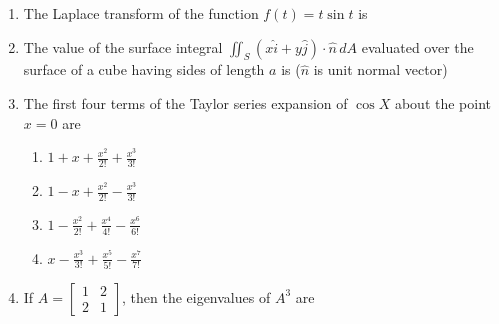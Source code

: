 \documentclass[journal,12pt,onecolumn]{IEEEtran}
\theoremstyle{remark}
\begin{document}
\begin{enumerate}
\item The Laplace transform of the function $f(t) = t \sin t$ is
\hfill{}
\begin{enumerate}
\end{enumerate}

\item The value of the surface integral $\iint_S (x\hat{i}+y\hat{j})\cdot\hat{n}\,dA$ evaluated over the surface of a cube having sides of length $a$ is ($\hat{n}$ is unit normal vector)
\hfill{}
\begin{enumerate}
\end{enumerate}

\item The first four terms of the Taylor series expansion of $\cos X$ about the point $x = 0$ are
\hfill{}
\begin{enumerate}
\item $1 + x + \frac{x^2}{2!} + \frac{x^3}{3!}$
\item $1 - x + \frac{x^2}{2!} - \frac{x^3}{3!}$
\item $1 - \frac{x^2}{2!} + \frac{x^4}{4!} - \frac{x^6}{6!}$
\item $x - \frac{x^3}{3!} + \frac{x^5}{5!} - \frac{x^7}{7!}$
\end{enumerate}

\item If $A = \begin{bmatrix} 1 & 2 \\ 2 & 1 \end{bmatrix}$, then the eigenvalues of $A^3$ are
\hfill{}
\begin{enumerate}
\end{enumerate}


\end{enumerate}
\end{document}
